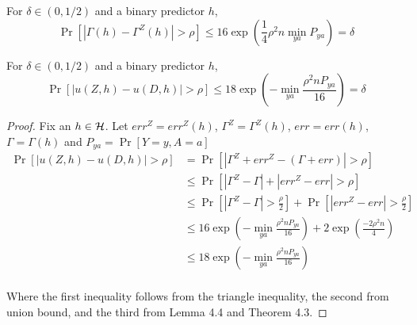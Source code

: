 \begin{lemma} For $\delta \in (0,1/2)$ and a binary predictor $h$,
	$$\Pr[|\Gamma(h) - \Gamma^Z(h)|>\rho ] \leq 16 \exp(\frac{1}{4}\rho^2n
	\min_{ya}{P_{ya}}) = \delta$$
\end{lemma}

\begin{lemma}
	For $\delta \in (0,1/2)$ and a binary predictor $h$,
	$$\Pr[|u(Z,h) - u(D,h)| > \rho] \leq 18\exp(-\min_{ya}{\frac{\rho^2 n
	P_{ya}}{16}}) = \delta$$
\end{lemma}
\begin{proof}
	Fix an $h \in \mathcal{H}$. Let $err^Z = err^Z(h)$, $\Gamma^Z = \Gamma^Z(h)$, $err = err(h)$, $\Gamma = \Gamma(h)$ and $P_{ya} = \Pr[Y=y, A=a]$
	\begin{align*}
	\Pr[|u(Z,h) - u(D,h)| > \rho] & = \Pr[|\Gamma^Z + err^Z - (\Gamma +err) | > \rho]\\
	&\leq \Pr[|\Gamma^Z - \Gamma|  + |err^Z - err| > \rho]\\
	&\leq \Pr[|\Gamma^Z - \Gamma|> \frac{\rho}{2}]  + \Pr[|err^Z - err| > \frac{\rho}{2}]\\
	&\leq 16\exp(-\min_{ya}{\frac{\rho^2 n P_{ya}}{16}}) + 2\exp(\frac{-2\rho^2n}{4})\\
	&\leq 18\exp(-\min_{ya}{\frac{\rho^2 n P_{ya}}{16}})\\	
	\end{align*}
	
	Where the first inequality follows from the triangle inequality, the second from union bound, and the third from Lemma 4.4 and Theorem 4.3.
\end{proof}


